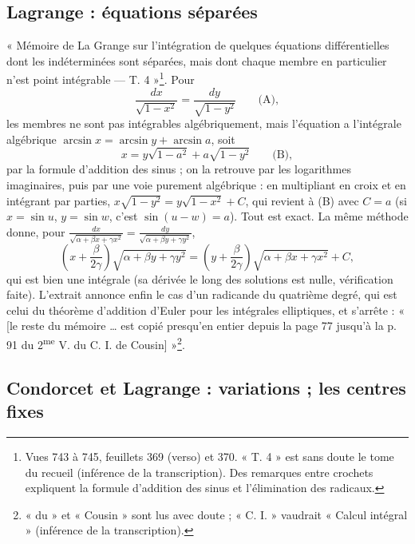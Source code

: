 \documentclass[11pt,a4paper]{article}
\begin{document}
\subsection*{Lagrange : équations séparées}

« Mémoire de La Grange sur l'intégration de quelques équations différentielles dont les indéterminées sont séparées, mais dont chaque membre en particulier n'est point intégrable — T. 4 »\footnote{Vues 743 à 745, feuillets 369 (verso) et 370. « T. 4 » est sans doute le tome du recueil (inférence de la transcription). Des remarques entre crochets expliquent la formule d'addition des sinus et l'élimination des radicaux.}. Pour
\[ \frac{dx}{\sqrt{1-x^2}}=\frac{dy}{\sqrt{1-y^2}}\qquad\text{(A)}, \]
les membres ne sont pas intégrables algébriquement, mais l'équation a l'intégrale algébrique $\arcsin x=\arcsin y+\arcsin a$, soit
\[ x=y\sqrt{1-a^2}+a\sqrt{1-y^2}\qquad\text{(B)}, \]
par la formule d'addition des sinus ; on la retrouve par les logarithmes imaginaires, puis par une voie purement algébrique : en multipliant en croix et en intégrant par parties, $x\sqrt{1-y^2}=y\sqrt{1-x^2}+C$, qui revient à (B) avec $C=a$ (si $x=\sin u$, $y=\sin w$, c'est $\sin(u-w)=a$). Tout est exact. La même méthode donne, pour $\frac{dx}{\sqrt{\alpha+\beta x+\gamma x^2}}=\frac{dy}{\sqrt{\alpha+\beta y+\gamma y^2}}$,
\[ \left(x+\frac{\beta}{2\gamma}\right)\sqrt{\alpha+\beta y+\gamma y^2}=\left(y+\frac{\beta}{2\gamma}\right)\sqrt{\alpha+\beta x+\gamma x^2}+C, \]
qui est bien une intégrale (sa dérivée le long des solutions est nulle, vérification faite). L'extrait annonce enfin le cas d'un radicande du quatrième degré, qui est celui du théorème d'addition d'Euler pour les intégrales elliptiques, et s'arrête : « [le reste du mémoire … est copié presqu'en entier depuis la page 77 jusqu'à la p. 91 du 2\textsuperscript{me} V. du C. I. de Cousin] »\footnote{« du » et « Cousin » sont lus avec doute ; « C. I. » vaudrait « Calcul intégral » (inférence de la transcription).}.

\subsection*{Condorcet et Lagrange : variations ; les centres fixes}
\end{document}
